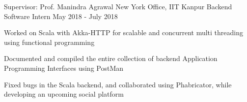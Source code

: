 
\begin{cventries}

  \cventry
    {Supervisor: Prof. Manindra Agrawal}
    {New York Office, IIT Kanpur}
    {Backend Software Intern}
    {May 2018 - July 2018}
    {
      \begin{cvitems}
        \item{Worked on Scala with Akka-HTTP for scalable and concurrent multi threading using functional programming}
        \item{Documented and compiled the entire collection of backend Application Programming Interfaces using PostMan}
        \item{Fixed bugs in the Scala backend, and collaborated using Phabricator, while developing an upcoming social platform}
      \end{cvitems}
    }

\end{cventries}
